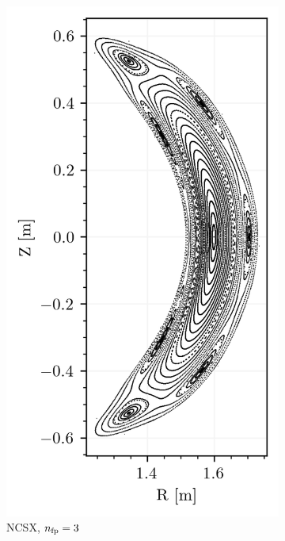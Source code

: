 \begin{figure}[H]
\begin{subfigure}{0.32\textwidth}
        \centering
        \includegraphics[width=\textwidth]{images/theory/ncsx.png}
        \caption{NCSX, $n_\text{fp} = 3$}
        \label{fig:ncsx-default}
    \end{subfigure}
    \hfill
    \begin{subfigure}{0.32\textwidth}
        \centering

\end{subfigure}
\end{figure}
